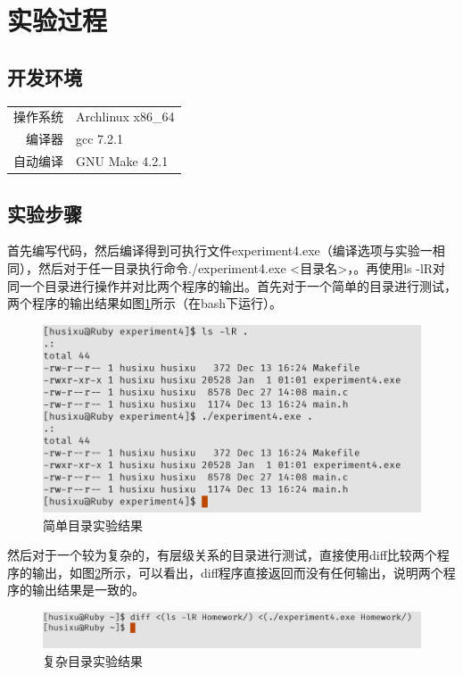 \documentclass{report}
\begin{document}
\section{实验过程}
\label{sec:shi_yan_guo_cheng_4}

\subsection{开发环境}
\label{sub:kai_fa_huan_jing_4}

\begin{tabular}{r l}
    操作系统 & Archlinux x86\_64 \\
    编译器 & gcc 7.2.1 \\
    自动编译 & GNU Make 4.2.1 \\
\end{tabular}

\subsection{实验步骤}
\label{sub:shi_yan_bu_zou_4}

首先编写代码，然后编译得到可执行文件experiment4.exe（编译选项与实验一相同），然后对于任一目录执行命令./experiment4.exe <目录名>，。再使用ls -lR对同一个目录进行操作并对比两个程序的输出。首先对于一个简单的目录进行测试，两个程序的输出结果如图\ref{fig:exp4Result}所示（在bash下运行）。

\begin{figure}[ht]
    \centering
    \includegraphics[width=0.8\linewidth]{exp4Result.png}
    \caption{简单目录实验结果}
    \label{fig:exp4Result}
\end{figure}

然后对于一个较为复杂的，有层级关系的目录进行测试，直接使用diff比较两个程序的输出，如图\ref{fig:exp4Result2}所示，可以看出，diff程序直接返回而没有任何输出，说明两个程序的输出结果是一致的。

\begin{figure}[ht]
    \centering
    \includegraphics[width=0.8\linewidth]{exp4Result2.png}
    \caption{复杂目录实验结果}
    \label{fig:exp4Result2}
\end{figure}
\end{document}
